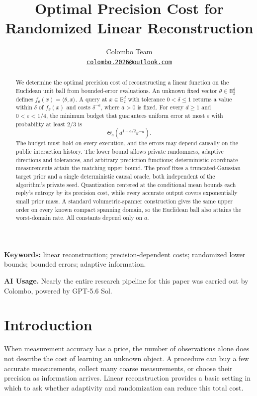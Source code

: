 \documentclass[11pt,a4paper]{article}
\title{\textbf{Optimal Precision Cost for\\Randomized Linear Reconstruction}}
\author{Colombo Team\\[0.35em]
\small\href{mailto:colombo.2026@outlook.com}{\texttt{colombo.2026@outlook.com}}}
\date{}
\newcommand{\B}{\mathbb B}
\newcommand{\eps}{\varepsilon}
\theoremstyle{definition}
\theoremstyle{remark}
\begin{document}
\maketitle
\begin{abstract}
We determine the optimal precision cost of reconstructing a linear function on the Euclidean unit ball from bounded-error evaluations. An unknown fixed vector $\theta\in\B_2^d$ defines $f_\theta(x)=\langle\theta,x\rangle$. A query at $x\in\B_2^d$ with tolerance $0<\delta\le1$ returns a value within $\delta$ of $f_\theta(x)$ and costs $\delta^{-a}$, where $a>0$ is fixed. For every $d\ge1$ and $0<\eps<1/4$, the minimum budget that guarantees uniform error at most $\eps$ with probability at least $2/3$ is
\[
 \Theta_a\!\left(d^{1+a/2}\eps^{-a}\right).
\]
The budget must hold on every execution, and the errors may depend causally on the public interaction history. The lower bound allows private randomness, adaptive directions and tolerances, and arbitrary prediction functions; deterministic coordinate measurements attain the matching upper bound. The proof fixes a truncated-Gaussian target prior and a single deterministic causal oracle, both independent of the algorithm's private seed. Quantization centered at the conditional mean bounds each reply's entropy by its precision cost, while every accurate output covers exponentially small prior mass. A standard volumetric-spanner construction gives the same upper order on every known compact spanning domain, so the Euclidean ball also attains the worst-domain rate. All constants depend only on $a$.
\end{abstract}
\noindent\textbf{Keywords:} linear reconstruction; precision-dependent costs; randomized lower bounds; bounded errors; adaptive information.

\begin{samepage}
\noindent\textbf{AI Usage.}
Nearly the entire research pipeline for this paper was carried out by
Colombo, powered by GPT-5.6 Sol.
\par
\end{samepage}

\section{Introduction}\label{sec:intro}
When measurement accuracy has a price, the number of observations alone does not describe the cost of learning an unknown object. A procedure can buy a few accurate measurements, collect many coarse measurements, or choose their precision as information arrives. Linear reconstruction provides a basic setting in which to ask whether adaptivity and randomization can reduce this total cost.
\end{document}
